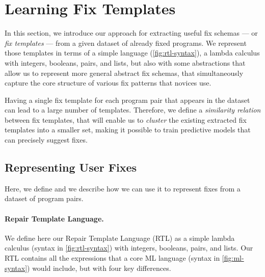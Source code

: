 \section{Learning Fix Templates}
\label{sec:templ-cluster}

In this section, we introduce our approach for extracting useful fix schemas ---
or \emph{fix templates} --- from a given dataset of already fixed programs. We
represent those templates in terms of a simple language \repairLang
(\autoref{fig:rtl-syntax}), a lambda calculus with integers, booleans, pairs,
and lists, but also with some abstractions that allow us to represent more
general abstract fix schemas, that simultaneously capture the core structure of
various fix patterns that novices use.

Having a single fix template for each program pair that appears in the dataset
can lead to a large number of templates. Therefore, we define  a
\emph{similarity relation} between fix templates, that will enable us to
\emph{cluster} the existing extracted fix templates into a smaller set, making
it possible to train predictive models that can precisely suggest fixes.





\subsection{Representing User Fixes}
\label{sec:templ-cluster:lang}
Here, we define \repairLang and we describe how we can use it to represent fixes
from a dataset of program pairs.

\paragraph{Repair Template Language.}
We define here our Repair Template Language (RTL) as a simple lambda calculus
(\repairLang syntax in \autoref{fig:rtl-syntax}) with integers, booleans, pairs,
and lists. Our RTL contains all the expressions that a core ML language \lang
(syntax in \autoref{fig:ml-syntax}) would include, but with four key
differences.


